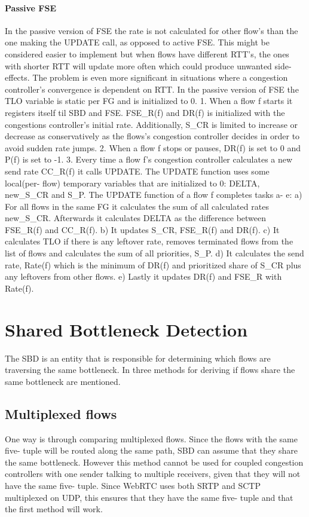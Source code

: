 \documentclass[UKenglish]{ifimaster}
\begin{document}
\paragraph{Passive FSE}
In the passive version of FSE the rate is not calculated for other flow's than the one making the UPDATE call, as opposed to active FSE.
This might be considered easier to implement but when flows have different RTT's, the ones with shorter RTT will update more often which could produce unwanted side- effects.
The problem is even more significant in situations where a congestion controller's convergence is dependent on RTT. %
In the passive version of FSE the TLO variable is static per FG and is initialized to 0. 
1. When a flow f starts it registers itself til SBD and FSE. FSE\_R(f) and DR(f) is initialized with the congestions controller's initial rate. 
Additionally, S\_CR is limited to increase or decrease as conservatively as the flows's congestion controller decides in order to avoid sudden rate jumps.
2. When a flow f stops or pauses, DR(f) is set to 0 and P(f) is set to -1. %
3. Every time a flow f's congestion controller calculates a new send rate CC\_R(f) it calls UPDATE.
The UPDATE function uses some local(per- flow) temporary variables that are initialized to 0: DELTA, new\_S\_CR and S\_P.
The UPDATE function of a flow f completes tasks a- e:
a) For all flows in the same FG it calculates the sum of all calculated rates new\_S\_CR.
Afterwards it calculates DELTA as the difference between FSE\_R(f) and CC\_R(f).
b) It updates S\_CR, FSE\_R(f) and DR(f).
c) It calculates TLO if there is any leftover rate, removes terminated flows from the list of flows and calculates the sum of all priorities, S\_P.
d) It calculates the send rate, Rate(f) which is the minimum of DR(f) and prioritized share of S\_CR plus any leftovers from other flows.
e) Lastly it updates DR(f) and FSE\_R with Rate(f).

\section{Shared Bottleneck Detection}
The SBD is an entity that is responsible for determining which flows are traversing the same bottleneck. 
In \cite{rfc8699} three methods for deriving if flows share the same bottleneck are mentioned.

\subsection{Multiplexed flows}
One way is through comparing multiplexed flows. 
Since the flows with the same five- tuple will be routed along the same path, SBD can assume that they share the same bottleneck. 
However this method cannot be used for coupled congestion controllers with one sender talking to multiple receivers, given that they will not have the same five- tuple. 
Since WebRTC uses both SRTP and SCTP multiplexed on UDP, this ensures that they have the same five- tuple and that the first method will work. 
\end{document}
